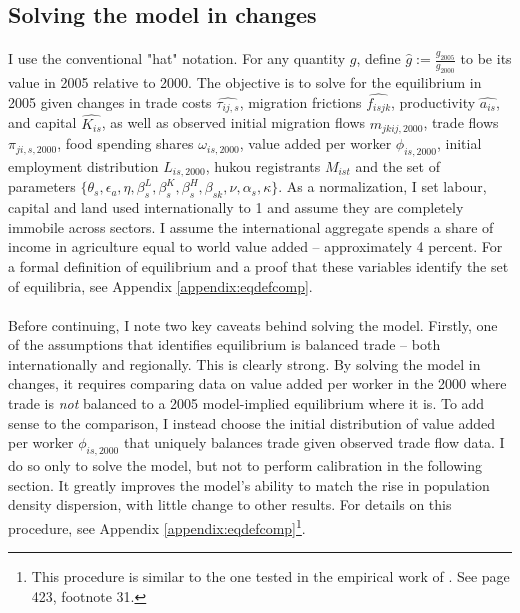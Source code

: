 \documentclass[]{article}
\theoremstyle{plain}
\begin{document}

\subsection*{Solving the model in changes}
\paragraph*{}
I use the conventional "hat" notation. For any quantity $g$, define $\hat{g} := \frac{g_{2005}}{g_{2000}}$ to be its value in 2005 relative to 2000. The objective is to solve for the equilibrium in 2005 given changes in trade costs $\hat{\tau_{ij, s}}$, migration frictions $\hat{f_{isjk}}$, productivity $\hat{a_{is}}$, and capital $\hat{K_{is}}$, as well as observed initial migration flows $m_{jkij, 2000}$, trade flows $\pi_{ji,s,2000}$, food spending shares $\omega_{is, 2000}$, value added per worker $\phi_{is, 2000}$, initial employment distribution $L_{is, 2000}$, hukou registrants $M_{ist}$ and the set of parameters $\{\theta_{s}, \epsilon_{a}, \eta, \beta_{s}^{L}, \beta^{K}_{s}, \beta^{H}_{s}, \beta_{sk}, \nu, \alpha_{s}, \kappa\}$. As a normalization, I set labour, capital and land used internationally to 1 and assume they are completely immobile across sectors. I assume the international aggregate spends a share of income in agriculture equal to world value added -- approximately 4 percent.  For a formal definition of equilibrium and a proof that these variables identify the set of equilibria, see Appendix \ref{appendix:eqdefcomp}.
\paragraph*{}
Before continuing, I note two key caveats behind solving the model. Firstly, one of the assumptions that identifies equilibrium is balanced trade -- both internationally and regionally. This is clearly strong. By solving the model in changes, it requires comparing data on value added per worker in the 2000 where trade is \textit{not} balanced to a 2005 model-implied equilibrium where it is. To add sense to the comparison, I instead choose the initial distribution of value added per worker $\phi_{is,2000}$ that uniquely balances trade given observed trade flow data. I do so only to solve the model, but not to perform calibration in the following section. It greatly improves the model's ability to match the rise in population density dispersion, with little change to other results. For details on this procedure, see Appendix \ref{appendix:eqdefcomp}\footnote{This procedure is similar to the one tested in the empirical work of \citet*{universalgrav}. See page 423, footnote 31.}.   
\end{document}
